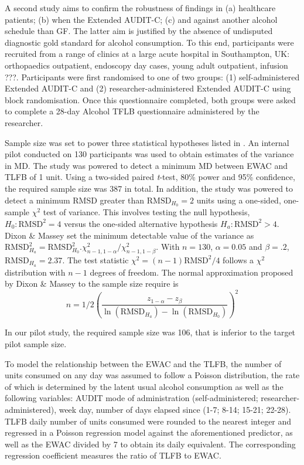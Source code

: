 \documentclass[]{article}
\begin{document}
A second study aims to confirm the robustness of findings in (a)
healthcare patients; (b) when the Extended AUDIT-C; (c) and against
another alcohol schedule than GF. The latter aim is justified by the
absence of undisputed diagnostic gold standard for alcohol consumption.
To this end, participants were recruited from a range of clinics at a
large acute hospital in Southampton, UK: orthopaedics outpatient,
endoscopy day cases, young adult outpatient, infusion ???. Participants
were first randomised to one of two groups: (1) self-administered
Extended AUDIT-C and (2) researcher-administered Extended AUDIT-C using
block randomisation. Once this questionnaire completed, both groups were
asked to complete a 28-day Alcohol TFLB questionnaire administered by
the researcher.

Sample size was set to power three statistical hypotheses listed in
\cite{Dutey2018}. An internal pilot conducted on 130 participants was
used to obtain estimates of the variance in MD. The study was powered to
detect a minimum MD between EWAC and TLFB of 1 unit. Using a two-sided
paired \emph{t}-test, 80\% power and 95\% confidence, the required
sample size was 387 in total. In addition, the study was powered to
detect a minimum RMSD greater than \(\text{RMSD}_{H_0} = 2\) units using
a one-sided, one-sample \(\chi^2\) test of variance. This involves
testing the null hypothesis, \(H_0: \text{RMSD}^2 = 4\) versus the
one-sided alternative hypothesis \(H_a: \text{RMSD}^2 > 4\). Dixon \&
Massey \citep{Dixon1983} set the minimum detectable value of the
variance as
\(\text{RMSD}_{H_a}^2 = \text{RMSD}_{H_0}^2 . \chi^2_{n-1, 1-\alpha} / \chi^2_{n-1, 1-\beta}\).
With \(n = 130\), \(\alpha = 0.05\) and \(\beta=.2\),
\(\text{RMSD}_{H_a} = 2.37\). The test statistic
\(\chi^2 = (n-1)\text{RMSD}^2 / 4\) follows a \(\chi^2\) distribution
with \(n-1\) degrees of freedom. The normal approximation proposed by
Dixon \& Massey \citep{Dixon1983} to the sample size require is
\[n = 1/2 \left( \dfrac{z_{1-\alpha}-z_\beta}{\ln(\text{RMSD}_{H_a}) - \ln(\text{RMSD}_{H_0})}\right)^2  \]

In our pilot study, the required sample size was 106, that is inferior
to the target pilot sample size.

To model the relationship between the EWAC and the TLFB, the number of
units consumed on any day was assumed to follow a Poisson distribution,
the rate of which is determined by the latent usual alcohol consumption
as well as the following variables: AUDIT mode of administration
(self-administered; researcher-administered), week day, number of days
elapsed since (1-7; 8-14; 15-21; 22-28). TLFB daily number of units
consumed were rounded to the nearest integer and regressed in a Poisson
regression model against the aforementioned predictor, as well as the
EWAC divided by 7 to obtain its daily equivalent. The corresponding
regression coefficient measures the ratio of TLFB to EWAC.
\end{document}
